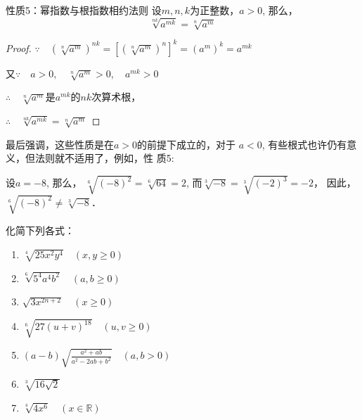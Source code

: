 \begin{blk}{性质5：幂指数与根指数相约法则}
设$m,n,k$为正整数，$a>0$, 那么，
\[\sqrt[nk]{a^{mk}}=\sqrt[n]{a^m} \]  
\end{blk}

\begin{proof}
$\because\quad \left(\sqrt[n]{a^m}\right)^{nk}=\left[\left(\sqrt[n]{a^m}\right)^n\right]^k=\left(a^m\right)^k=a^{mk}$

又$\because\quad a>0,\quad \sqrt[n]{a^m}>0,\quad a^{mk}>0 $
    
$\therefore\quad \sqrt[n]{a^m}$是$a^{mk}$的$nk$次算术根，

$\therefore\quad \sqrt[nk]{a^{mk}}=\sqrt[n]{a^m} $
\end{proof}

最后强调，这些性质是在$a>0$的前提下成立的，对于
$a<0$, 有些根式也许仍有意义，但法则就不适用了，例如，性
质5:

设$a=-8$, 那么，
$\sqrt[6]{(-8)^2}=\sqrt[6]{64}=2$, 而$\sqrt[3]{-8}=\sqrt[3]{(-2)^3}=-2$，
因此，$\sqrt[6]{(-8)^2}\ne \sqrt[3]{-8}$．



\begin{example}
    化简下列各式：
\begin{enumerate}
\item $\sqrt[4]{25 x^{2} y^{4}} \quad(x, y \ge 0)$
\item  $\sqrt[6]{5^{4} a^{4} b^{2}}\quad (a, b \ge 0)$
\item $\sqrt{3 x^{2 n+2}}\quad (x \ge 0)$
\item $\sqrt[6]{27(u+v)^{18}}\quad (u,v\ge 0)$
\item $(a-b) \sqrt{\frac{a^{2}+a b}{a^{2}-2 a b+b^{2}}}\quad (a, b>0)$
\item $\sqrt[3]{16 \sqrt{2}}$
\item $\sqrt[4]{4 x^{6}}\quad (x \in \mathbb{R})$
\end{enumerate}
\end{example}

